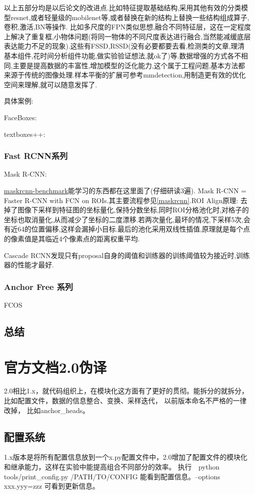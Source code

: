 \documentclass[UTF8]{ctexart}
\begin{document}
以上五部分均是以后论文的改进点.比如特征提取基础结构,采用其他有效的分类模型resnet,或者轻量级的mobilenet等,或者替换在新的结构上替换一些结构组成算子,卷积,激活,BN等操作. 比如多尺度的FPN类似思想,融合不同特征层，这在一定程度上解决了重复框,小物体问题(将同一物体的不同尺度表达进行融合,当然能减缓底层表达能力不足的现象).这些有FSSD,RSSD(没有必要都要去看,检测类的文章,理清基本组件,花时间分析组件功能,做实验验证想法,就ok了)等.数据增强的方式各不相同,主要是提高数据的丰富性,增加模型的泛化能力,这个属于工程问题,基本方法都来源于传统的图像处理.样本平衡的扩展可参考mmdetection,用制造更有效的优化空间来理解,就可以随意发挥了.

具体案例:

FaceBoxes:

textboxes++:


\subsubsection{Fast RCNN系列}
Mask R-CNN:

\href{https://github.com/facebookresearch/maskrcnn-benchmark}{maskrcnn-benchmark}能学习的东西都在这里面了(仔细研读3遍). 
Mask R-CNN = Faster R-CNN  with FCN on ROIs.其主要流程参见\ref{maskrcnn}.ROI Align原理:
去掉了图像下采样到特征图的坐标量化,保持分数坐标,同时ROI分格池化时,对格子的坐标也取消量化,从而减少了坐标的二度漂移.若两次量化,最坏的情况,下采样5次,会有近64的位置偏移,这样会漏掉小目标.最后的池化采用双线性插值,原理就是每个点的像素值是其临近4个像素点的距离权重平均.

Cascade RCNN发现只有proposal自身的阈值和训练器的训练阈值较为接近时,训练器的性能才最好.
\subsubsection{Anchor Free 系列}
FCOS


\subsection{总结}


\section{官方文档2.0伪译}
2.0相比1.x，就代码组织上，在模块化这方面有了更好的贯彻。能拆分的就拆分，比如配置文件，数据的信息整合、变换、采样迭代，
以前版本命名不严格的一律改掉， 比如anchor\_heads。
\subsection{配置系统}
1.x版本是将所有配置信息放到一个x.py配置文件中，2.0增加了配置文件的模块化和继承能力，这样在实验中能提高组合不同部分的效率。
执行　python tools/print\_config.py /PATH/TO/CONFIG 能看到配置信息。--options xxx.yyy=zzz  可看到更新信息。
\end{document}
